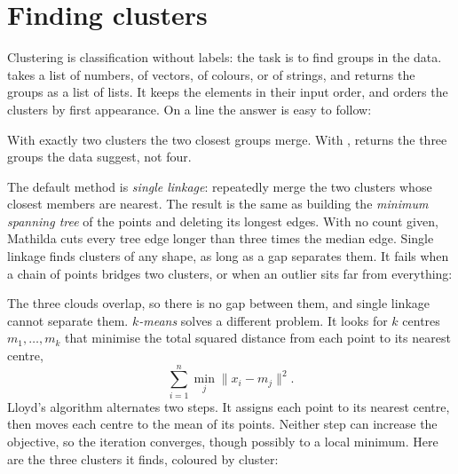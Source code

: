 \section{Finding clusters}
\label{sec:ml-clusters}

Clustering is classification without labels: the task is to
find groups in the data.  takes a list of numbers, of vectors, of
colours, or of strings, and returns the groups as a list of lists. It keeps the
elements in their input order, and orders the clusters by first appearance. On a
line the answer is easy to follow:

\begin{codepairs}
\end{codepairs}

With exactly two clusters the two closest groups merge. With ,
 returns the three groups the data suggest, not four.

The default method is \emph{single linkage}: repeatedly
merge the two clusters whose closest members are nearest. The result is the same
as building the \emph{minimum spanning tree} of the points and deleting its
longest edges. With no count given, Mathilda cuts every tree edge longer than
three times the median edge. Single linkage finds clusters of any shape, as long
as a gap separates them. It fails when a chain of points bridges two clusters, or
when an outlier sits far from everything:

\begin{codepairs}
\end{codepairs}

The three clouds overlap, so there is no gap between them, and single linkage
cannot separate them. \emph{\(k\)-means} solves a different
problem. It looks for \(k\) centres \(m_1, \dots, m_k\) that minimise the total
squared distance from each point to its nearest centre,
\[
  \sum_{i=1}^{n} \min_{j} \lVert x_i - m_j \rVert^2 .
\]
Lloyd's algorithm alternates two steps. It assigns each point to its nearest
centre, then moves each centre to the mean of its points. Neither step can
increase the objective, so the iteration converges, though possibly to a local
minimum. Here are the three clusters it finds, coloured by cluster:

